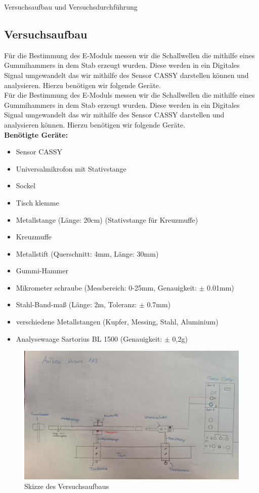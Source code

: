 \documentclass[twoside]{protokoll}
\begin{document}
\begin{aufgabe}{Versuchsaufbau und Versuchsdurchführung}
\subsection{Versuchsaufbau}
  Für die Bestimmung des E-Moduls messen wir die Schallwellen die mithilfe eines Gummihammers in dem Stab erzeugt wurden.
    Diese werden in ein Digitales Signal umgewandelt das wir mithilfe des Sensor CASSY darstellen können und analysieren.
    Hierzu benötigen wir folgende Geräte.\\

    Für die Bestimmung des E-Moduls messen wir die Schallwellen die mithilfe eines Gummihammers in dem Stab erzeugt wurden.
    Diese werden in ein Digitales Signal umgewandelt das wir mithilfe des Sensor CASSY darstellen und analysieren können.
    Hierzu benötigen wir folgende Geräte.\\

\textbf{Benötigte Geräte:}
\begin{itemize}
\item Sensor CASSY
\item Universalmikrofon mit Stativstange
\item Sockel
\item Tisch klemme
\item Metallstange (Länge: 20cm) (Stativstange für Kreuzmuffe)
\item Kreuzmuffe
\item Metallstift (Querschnitt: 4mm, Länge: 30mm)
\item Gummi-Hammer
\item Mikrometer schraube (Messbereich: 0-25mm, Genauigkeit: $\pm$ 0.01mm)
\item Stahl-Band-maß (Länge: 2m, Toleranz: $\pm$ 0.7mm)
\item verschiedene Metallstangen (Kupfer, Messing, Stahl, Aluminium)
\item Analysewaage Sartorius BL 1500 (Genauigkeit: $\pm$ 0,2g)
\end{itemize}


\begin{figure}[H]
  \centering
  \includegraphics[width=1\textwidth]{Bilder/434170_428396_1A3_SkizzeAufbau.pdf}
  \caption{Skizze des Versuchsaufbaus}
  \centering
\end{figure}
 

\end{aufgabe}
\end{document}
